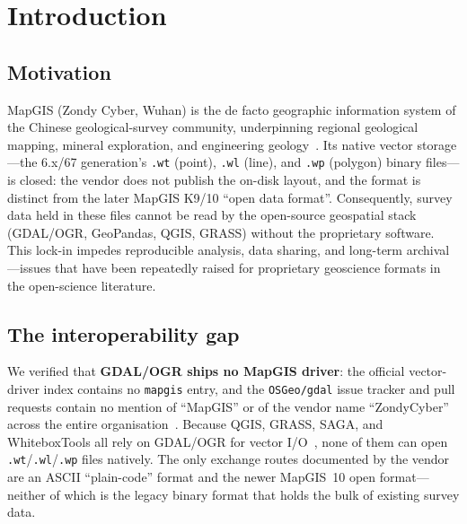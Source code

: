 \documentclass[11pt,a4paper]{article}
\begin{document}
\section{Introduction}

\subsection{Motivation}
MapGIS (Zondy Cyber, Wuhan) is the de facto geographic information system of the Chinese geological-survey community, underpinning regional geological mapping, mineral exploration, and engineering geology~\cite{ma2012,han2012}. Its native vector storage---the 6.x/67 generation's \texttt{.wt} (point), \texttt{.wl} (line), and \texttt{.wp} (polygon) binary files---is closed: the vendor does not publish the on-disk layout, and the format is distinct from the later MapGIS K9/10 ``open data format''. Consequently, survey data held in these files cannot be read by the open-source geospatial stack (GDAL/OGR, GeoPandas, QGIS, GRASS) without the proprietary software. This lock-in impedes reproducible analysis, data sharing, and long-term archival---issues that have been repeatedly raised for proprietary geoscience formats in the open-science literature.

\subsection{The interoperability gap}
We verified that \textbf{GDAL/OGR ships no MapGIS driver}: the official vector-driver index contains no \texttt{mapgis} entry, and the \texttt{OSGeo/gdal} issue tracker and pull requests contain no mention of ``MapGIS'' or of the vendor name ``ZondyCyber'' across the entire organisation~\cite{gdalwebsite}. Because QGIS, GRASS, SAGA, and WhiteboxTools all rely on GDAL/OGR for vector I/O~\cite{warmerdam2008}, none of them can open \texttt{.wt}/\texttt{.wl}/\texttt{.wp} files natively. The only exchange routes documented by the vendor are an ASCII ``plain-code'' format and the newer MapGIS~10 open format---neither of which is the legacy binary format that holds the bulk of existing survey data.
\end{document}
